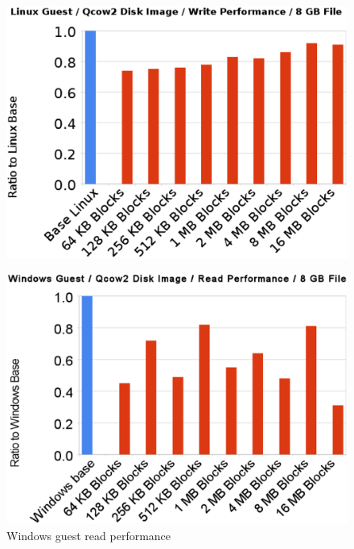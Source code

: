 \begin{figure}[tbp]
\begin{centering}
\label{fig:linux-write}
\includegraphics[scale=.7,angle=90]{figs/linux-write}
\end{centering}
\end{figure}

\begin{figure}[tbp]
\begin{centering}
\caption{Windows guest read performance}
\label{fig:windows-read}
\includegraphics[scale=.7,angle=90]{figs/windows-read}
\end{centering}
\end{figure}

